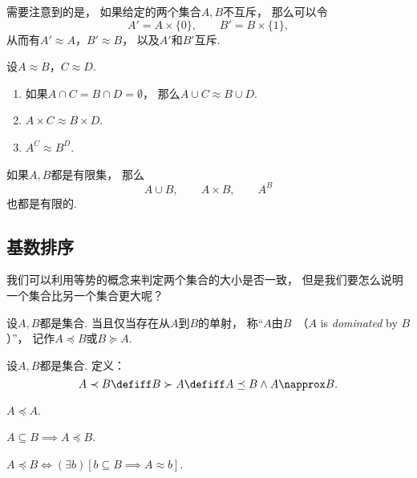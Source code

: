 需要注意到的是，
如果给定的两个集合\(A,B\)不互斥，
那么可以令\[
	A' = A\times\{0\}, \qquad
	B' = B\times\{1\},
\]
从而有\(A' \approx A\)，\(B' \approx B\)，
以及\(A'\)和\(B'\)互斥.

\begin{theorem}
设\(A \approx B\)，\(C \approx D\).
\begin{enumerate}
	\item 如果\(A \cap C = B \cap D = \emptyset\)，
	那么\(A \cup C \approx B \cup D\).
	\item \(A \times C \approx B \times D\).
	\item \(A^C \approx B^D\).
\end{enumerate}
\end{theorem}

\begin{theorem}
如果\(A,B\)都是有限集，
那么\[
	A \cup B, \qquad
	A \times B, \qquad
	A^B
\]也都是有限的.
\end{theorem}

\subsection{基数排序}
我们可以利用等势的概念来判定两个集合的大小是否一致，
但是我们要怎么说明一个集合比另一个集合更大呢？

\begin{definition}
设\(A,B\)都是集合.
当且仅当存在从\(A\)到\(B\)的单射，
称“\(A\)由\(B\)~（\(A\) is \emph{dominated} by \(B\)）”，
记作\(A \preceq B\)或\(B \succeq A\).
\end{definition}

\begin{definition}
设\(A,B\)都是集合.
定义：\[
	A \prec B
	\defiff
	B \succ A
	\defiff
	A \preceq B \land A \napprox B.
\]
\end{definition}

\begin{example}
\(A \preceq A\).
\end{example}

\begin{example}
\(A \subseteq B \implies A \preceq B\).
\end{example}

\begin{theorem}
\(A \preceq B
\iff
(\exists b)[b \subseteq B \implies A \approx b]\).
\end{theorem}

